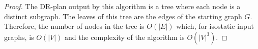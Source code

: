 \begin{proof}

The DR-plan  output by this algorithm is a tree where each node is a distinct subgraph. The leaves of this tree are the edges of the starting graph $G$. Therefore, the number of nodes in the tree is $O(|E|)$ which, for isostatic input graphs, is $O(|V|)$ and the complexity of the algorithm is $O(|V|^3)$.
%
\end{proof}








